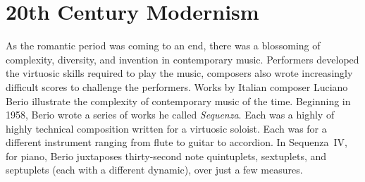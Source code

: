 
\section{20th Century Modernism}
\label{sec:modernism}
As the romantic period was coming to an end, there was a blossoming of
complexity, diversity, and invention in contemporary music. Performers
developed the virtuosic skills required to play the music, composers
also wrote increasingly difficult scores to challenge the
performers.\cite{grout2006} Works by Italian composer Luciano Berio
illustrate the complexity of contemporary music of the time. Beginning
in 1958, Berio wrote a series of works he called
\textit{Sequenza}. Each was a highly of highly technical composition
written for a virtuosic soloist. Each was for a different instrument
ranging from flute to guitar to accordion.  In Sequenza~IV, for piano,
Berio juxtaposes thirty-second note quintuplets, sextuplets, and
septuplets (each with a different dynamic), over just a few
measures. 

